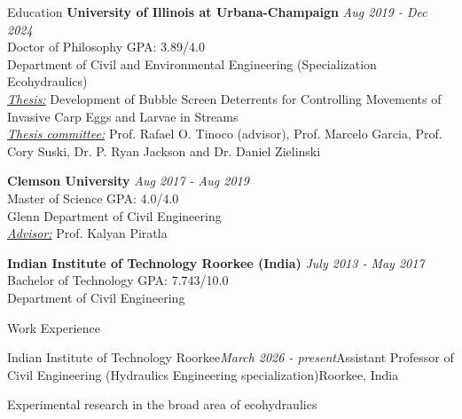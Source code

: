 \documentclass{resume} %
\begin{document}

\begin{rSection}{Education}
{\bf University of Illinois at Urbana-Champaign} \hfill {\em Aug 2019 - Dec 2024} 
\\ Doctor of Philosophy \hfill {GPA: 3.89/4.0}
\\ Department of Civil and Environmental Engineering (Specialization Ecohydraulics)
\\ \underline{\textit{Thesis:}} Development of Bubble Screen Deterrents for Controlling Movements of Invasive Carp Eggs and Larvae in Streams
\\ \underline{\textit{Thesis committee:}} Prof. Rafael O. Tinoco (advisor), Prof. Marcelo Garcia, Prof. Cory Suski, Dr. P. Ryan Jackson and Dr. Daniel Zielinski


{\bf Clemson University} \hfill {\em Aug 2017 - Aug 2019 } 
\\ Master of Science \hfill {GPA: 4.0/4.0}
\\ Glenn Department of Civil Engineering
\\ \underline{\textit{Advisor:}} Prof. Kalyan Piratla 

{\bf Indian Institute of Technology Roorkee (India) }  \hfill {\em July 2013 - May 2017}
\\Bachelor of Technology \hfill {GPA: 7.743/10.0}
\\Department of Civil Engineering



\begin{rSection}{Work Experience}
\begin{rSubsection}{Indian Institute of Technology Roorkee}{\em March 2026 - present}{Assistant Professor of Civil Engineering (Hydraulics Engineering specialization)}{Roorkee, India}
\item Experimental research in the broad area of ecohydraulics 
\end{rSubsection}


\end{rSection}
\end{rSection}
\end{document}
